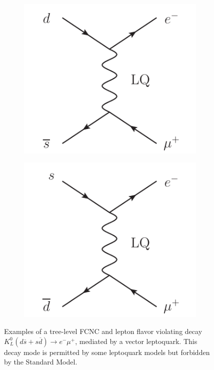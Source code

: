 \begin{figure}
  \centering
  \begin{subfigure}[b]{0.30\textwidth}
    \includegraphics[width=\textwidth]{tex/theory/fig/kaon_lq1}
    \caption{}
    \label{fig:feynman_LO_FD_FCNC_LQ_a}
  \end{subfigure}
  \begin{subfigure}[b]{0.30\textwidth}
    \includegraphics[width=\textwidth]{tex/theory/fig/kaon_lq2}
    \caption{}
    \label{fig:feynman_LO_FD_FCNC_LQ_b}
  \end{subfigure}
  \caption{
    Examples of a tree-level FCNC and lepton flavor violating 
    decay $K^{0}_{L}(d\overline{s}+s\overline{d}) \rightarrow e^{-}\mu^{+}$, mediated
    by a vector leptoquark.
    This decay mode is permitted by some leptoquark models \cite{pati-salam-su4-1,pati-salam-su4-2}
    but forbidden by the Standard Model.
  }
  \label{fig:feynman_LO_FD_FCNC_LQ}
\end{figure}
